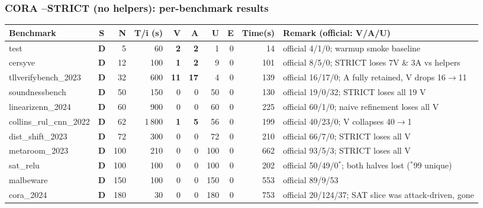 \documentclass[10pt]{beamer}
\newcommand{\sdone}{{\color{cdone}\textbf{D}}}
\begin{document}
\begin{frame}[fragile]
\frametitle{CORA --STRICT (no helpers): per-benchmark results}

\centering\tiny
\setlength{\tabcolsep}{3pt}
\begin{tabular}{l c r r r r r r r l}
\toprule
\textbf{Benchmark} & \textbf{S} & \textbf{N} & \textbf{T/i (s)} & \textbf{V} & \textbf{A} & \textbf{U} & \textbf{E} & \textbf{Time(s)} & \textbf{Remark (official: V/A/U)} \\
\midrule
test                             & \sdone & 5      & 60     & \textbf{2}  & \textbf{2}  & 1     & 0 & 14     & official 4/1/0; warmup smoke baseline \\
cersyve                          & \sdone & 12     & 100    & \textbf{1}  & \textbf{2}  & 9     & 0 & 101    & official 8/5/0; STRICT loses 7V \& 3A vs helpers \\
tllverifybench\_2023             & \sdone & 32     & 600    & \textbf{11} & \textbf{17} & 4     & 0 & 139    & official 16/17/0; A fully retained, V drops 16$\to$11 \\
soundnessbench                   & \sdone & 50     & 150    & 0           & 0           & 50    & 0 & 130    & official 19/0/32; STRICT loses all 19 V \\
linearizenn\_2024                & \sdone & 60     & 900    & 0           & 0           & 60    & 0 & 225    & official 60/1/0; naive refinement loses all V \\
collins\_rul\_cnn\_2022          & \sdone & 62     & 1\,800 & \textbf{1}  & \textbf{5}  & 56    & 0 & 199    & official 40/23/0; V collapses 40$\to$1 \\
dist\_shift\_2023                & \sdone & 72     & 300    & 0           & 0           & 72    & 0 & 210    & official 66/7/0; STRICT loses all V \\
metaroom\_2023                   & \sdone & 100    & 210    & 0           & 0           & 100   & 0 & 662    & official 93/5/3; STRICT loses all V \\
sat\_relu                        & \sdone & 100    & 100    & 0           & 0           & 100   & 0 & 202    & official 50/49/0$^{*}$; both halves lost ($^{*}$99 unique) \\
malbeware                        & \sdone & 150    & 100    & 0           & 0           & 150   & 0 & 553    & official 89/9/53 \\
cora\_2024                       & \sdone & 180    & 30     & 0           & 0           & 180   & 0 & 753    & official 20/124/37; SAT slice was attack-driven, gone \\

\end{tabular}
\end{frame}
\end{document}
